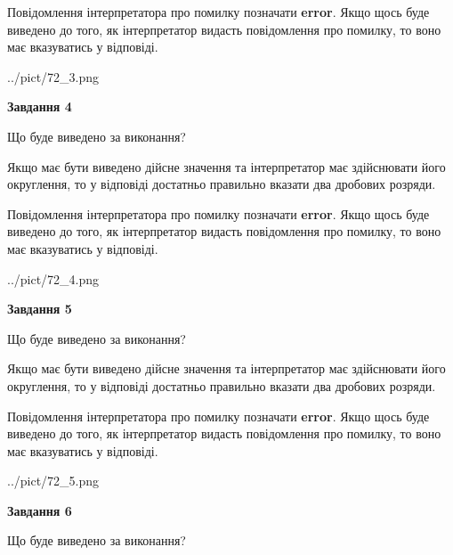 \documentclass[12pt, ukrainian]{article}
\begin{document}
{\begin {Large}
Повідомлення інтерпретатора про помилку позначати \textbf{error}.
Якщо щось буде виведено до того, як інтерпретатор видасть повідомлення про помилку, 
то воно має вказуватись у відповіді. \par

\begin{center}
	{../pict/72_3.png}
\end{center}
\newpage

{\begin {center}\textbf{Завдання 4}\end {center}}\par
Що буде виведено за виконання? \par

Якщо має бути виведено дійсне значення та інтерпретатор має здійснювати його округлення, 
то у відповіді достатньо правильно вказати два дробових розряди.

Повідомлення інтерпретатора про помилку позначати \textbf{error}.
Якщо щось буде виведено до того, як інтерпретатор видасть повідомлення про помилку, 
то воно має вказуватись у відповіді. \par

\begin{center}
	{../pict/72_4.png}
\end{center}
\newpage

{\begin {center}\textbf{Завдання 5}\end {center}}\par
Що буде виведено за виконання? \par

Якщо має бути виведено дійсне значення та інтерпретатор має здійснювати його округлення, 
то у відповіді достатньо правильно вказати два дробових розряди.

Повідомлення інтерпретатора про помилку позначати \textbf{error}.
Якщо щось буде виведено до того, як інтерпретатор видасть повідомлення про помилку, 
то воно має вказуватись у відповіді. \par

\begin{center}
	{../pict/72_5.png}
\end{center}
\newpage

{\begin {center}\textbf{Завдання 6}\end {center}}\par
Що буде виведено за виконання? \par


\end{Large}}
\end{document}
